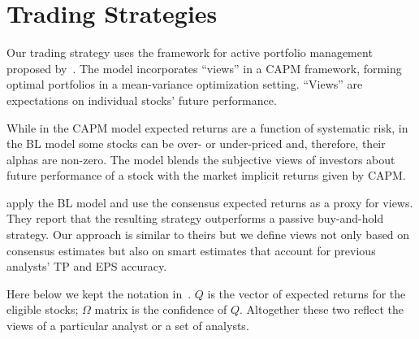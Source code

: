 \documentclass[a4paper,twoside,12pt,openright,notitlepage]{report}\usepackage[]{graphicx}\usepackage[]{color}
\begin{document}




\section{Trading Strategies}
\label{ch1-sec:trading}
Our trading strategy uses the framework for  active portfolio management proposed by~\cite{black1992}.  The model incorporates ``views'' in a CAPM framework, forming optimal portfolios in a mean-variance optimization setting. ``Views'' are expectations on individual stocks' future performance.

While in the CAPM model expected returns are a function of systematic risk, in the BL model some stocks can be over- or under-priced and, therefore, their alphas are non-zero. The model blends the subjective views of investors about future performance of a stock with the market implicit returns given by CAPM.

\cite{da2011bl} apply the BL model and use the consensus expected returns as a proxy for views. They report that the resulting strategy outperforms a passive buy-and-hold strategy. Our approach is similar to theirs but we define views not only based on consensus estimates but also on smart estimates that account for previous analysts' TP and EPS accuracy.

Here below we kept the notation in~\cite{black1992}.  $Q$ is the vector of  expected returns for the eligible stocks; $\Omega$ matrix is the confidence of $Q$. Altogether these two reflect the views of a particular analyst or a set of analysts.
\end{document}

